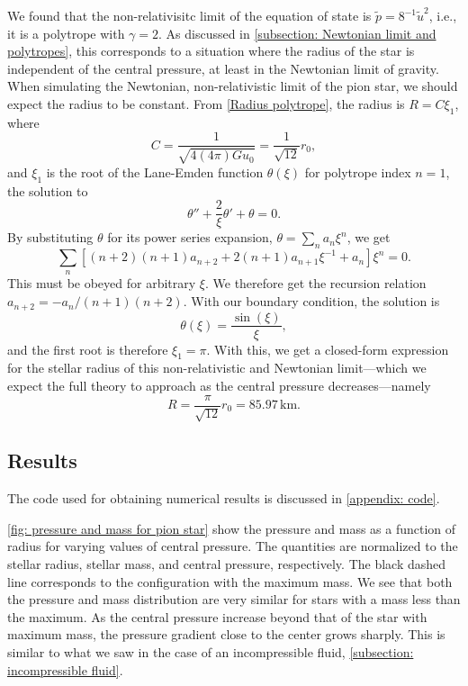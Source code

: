 We found that the non-relativisitc limit of the equation of state is $\tilde p =8^{-1} \tilde u^2$, i.e., it is a polytrope with $\gamma = 2$.
As discussed in \autoref{subsection: Newtonian limit and polytropes}, this corresponds to a situation where the radius of the star is independent of the central pressure, at least in the Newtonian limit of gravity.
When simulating the Newtonian, non-relativistic limit of the pion star, we should expect the radius to be constant.
From \autoref{Radius polytrope}, the radius is $R = C \xi_1$, where
%
\begin{equation}
    C = \frac{1}{\sqrt{4(4\pi ) G u_0}} = \frac{1}{\sqrt{12}}r_0,
\end{equation}
%
and $\xi_1$ is the root of the Lane-Emden function $\theta(\xi)$ for polytrope index $n=1$, the solution to
%
\begin{equation}
    \theta'' + \frac{2}{\xi} \theta' + \theta = 0.
\end{equation}
%
By substituting $\theta$ for its power series expansion, $\theta = \sum_n a_n \xi^n$, we get
%
\begin{equation}
    \sum_n \left[ (n+2)(n+1) a_{n+2} + 2(n+1) a_{n+1} \xi^{-1} + a_n \right] \xi^n = 0.
\end{equation}
%
This must be obeyed for arbitrary $\xi$.
We therefore get the recursion relation $a_{n+2} = - a_n / (n+1)(n+2)$.
With our boundary condition, the solution is
%
\begin{equation}
    \theta(\xi) = \frac{\sin(\xi)}{\xi},
\end{equation}
%
and the first root is therefore $\xi_1 = \pi$.
With this, we get a closed-form expression for the stellar radius of this non-relativistic and Newtonian limit---which we expect the full theory to approach as the central pressure decreases---namely
%
\begin{equation}
    \label{radius pion star nr limit}
    R = \frac{\pi}{\sqrt{12}} r_0 = 85.97 \, \text{km}.
\end{equation}


\subsection{Results}

The code used for obtaining numerical results is discussed in \autoref{appendix: code}.

\autoref{fig: pressure and mass for pion star} show the pressure and mass as a function of radius for varying values of central pressure.
The quantities are normalized to the stellar radius, stellar mass, and central pressure, respectively.
The black dashed line corresponds to the configuration with the maximum mass.
We see that both the pressure and mass distribution are very similar for stars with a mass less than the maximum.
As the central pressure increase beyond that of the star with maximum mass, the pressure gradient close to the center grows sharply.
This is similar to what we saw in the case of an incompressible fluid, \autoref{subsection: incompressible fluid}.

